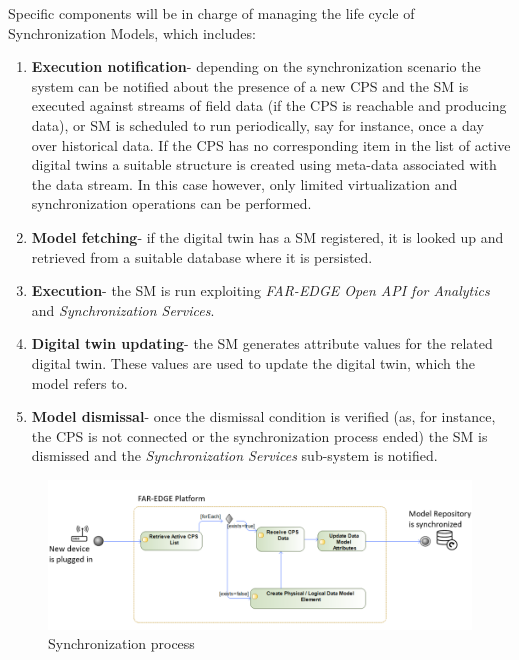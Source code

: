 Specific components will be in charge of managing the life cycle of Synchronization Models, which includes: 
\begin{enumerate}
\item \textbf{Execution notification}- depending on the synchronization scenario the system can be notified about the presence of a new CPS and the SM is executed against streams of field data (if the CPS is reachable and producing data), or SM is scheduled to run periodically, say for instance, once a day over historical data. If the CPS has no corresponding item in the list of active digital twins a suitable structure is created using meta-data associated with the data stream. In this case however, only limited virtualization and synchronization operations can be performed.
\item \textbf{Model fetching}- if the digital twin has a SM registered, it is looked up and retrieved from a suitable database where it is persisted. 
\item \textbf{Execution}- the SM is run exploiting \textit{FAR-EDGE Open API for Analytics} and\textit{ Synchronization Services}.
\item \textbf{Digital twin updating}- the SM generates attribute values for the related digital twin. These values are used to update the digital twin, which the model refers to.
\item \textbf{Model dismissal}- once the dismissal condition is verified (as, for instance, the CPS is not connected or the synchronization process ended) the SM is dismissed and the \textit{Synchronization Services} sub-system is notified.
\end{enumerate}



\begin{figure}
	\centering
	\includegraphics[width=\linewidth]{images/sm-scenario2}
	\caption{Synchronization process}
	\label{fig:sm-scenario}
\end{figure}

